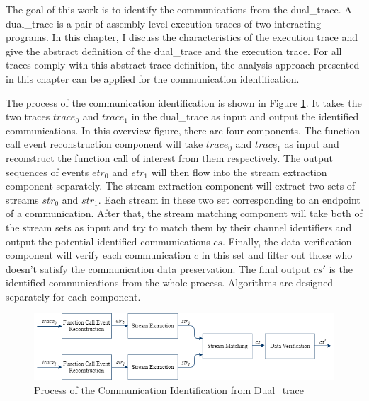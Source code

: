 


\label{chapter:alo}
The goal of this work is to identify the communications from the dual\_trace. A dual\_trace is a pair of assembly level execution traces of two interacting programs. In this chapter, I discuss the characteristics of the execution trace and give the abstract definition of the dual\_trace and the execution trace. For all traces comply with this abstract trace definition, the analysis approach presented in this chapter can be applied for the communication identification.

The process of the communication identification is shown in Figure \ref{overview}. It takes the two traces $trace_0$ and $trace_1$ in the dual\_trace as input and output the identified communications. In this overview figure, there are four components. The function call event reconstruction component will take $trace_0$ and $trace_1$ as input and reconstruct the function call of interest from them respectively. The output sequences of events $etr_0$ and $etr_1$ will then flow into the stream extraction component separately. The stream extraction component will extract two sets of streams $str_0$ and $str_1$. Each stream in these two set corresponding to an endpoint of a communication. After that, the stream matching component will take both of the stream sets as input and try to match them by their channel identifiers and output the potential identified communications $cs$. Finally, the data verification component will verify each communication $c$ in this set and filter out those who doesn't satisfy the communication data preservation. The final output $cs'$ is the identified communications from the whole process. Algorithms are designed separately for each component.

\begin{figure}[H]
\centerline{\includegraphics[scale=0.6]{Figures/overview}}
\caption{Process of the Communication Identification from Dual\_trace}
\label{overview}
\end{figure}

